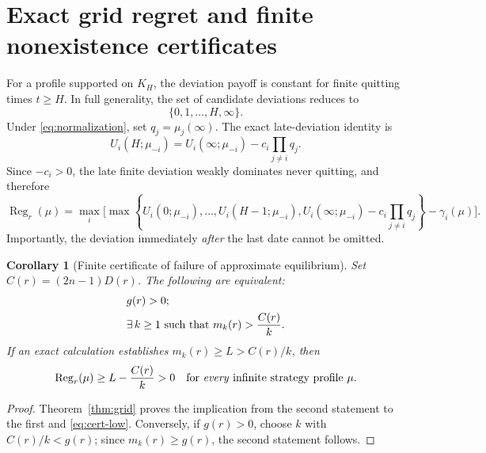 \documentclass[11pt,a4paper]{article}
\numberwithin{equation}{section}
\theoremstyle{plain}
\newtheorem{corollary}[theorem]{Corollary}
\theoremstyle{definition}
\theoremstyle{remark}
\newcommand{\Reg}{\operatorname{Reg}}
\begin{document}
\section{Exact grid regret and finite nonexistence certificates}\label{sec:certificates}
For a profile supported on $K_H$, the deviation payoff is constant
for finite quitting times $t\ge H$. In full generality, the set of
candidate deviations reduces to
\begin{equation}\label{eq:finite-deviation-list}
 \{0,1,\ldots,H,\infty\}.
\end{equation}
Under \eqref{eq:normalization}, set $q_j=\mu_j(\infty)$.
The exact late-deviation identity is
\begin{equation}\label{eq:late-general}
 U_i(H;\mu_{-i})=U_i(\infty;\mu_{-i})
 -c_i\prod_{j\ne i}q_j.
\end{equation}
Since $-c_i>0$, the late finite deviation weakly dominates never
quitting, and therefore
\begin{equation}\label{eq:finite-regret-formula}
 \Reg_r(\mu)=\max_i\Bigg[
 \max\left\{U_i(0;\mu_{-i}),\ldots,
 U_i(H-1;\mu_{-i}),
 U_i(\infty;\mu_{-i})-c_i\prod_{j\ne i}q_j\right\}
 -\gamma_i(\mu)\Bigg].
\end{equation}
Importantly, the deviation immediately \emph{after} the last
date cannot be omitted.

\begin{corollary}[Finite certificate of failure of approximate equilibrium]\label{cor:certificate}
Set $C(r)=(2n-1)D(r)$. The following are equivalent:
\begin{align}\label{eq:finite-iff}
 &g(r)>0;\\
 &\exists\,k\ge1\text{ such that }m_k(r)>\frac{C(r)}k.\notag
\end{align}
If an exact calculation establishes $m_k(r)\ge L>C(r)/k$, then
\begin{equation}\label{eq:cert-low}
 \Reg_r(\mu)\ge L-\frac{C(r)}k>0
 \quad\text{for \emph{every} infinite strategy profile }\mu.
\end{equation}
\end{corollary}
\begin{proof}
Theorem~\ref{thm:grid} proves the implication from the second
statement to the first and \eqref{eq:cert-low}. Conversely, if
$g(r)>0$, choose $k$ with $C(r)/k<g(r)$; since
$m_k(r)\ge g(r)$, the second statement follows.
\end{proof}
\end{document}
